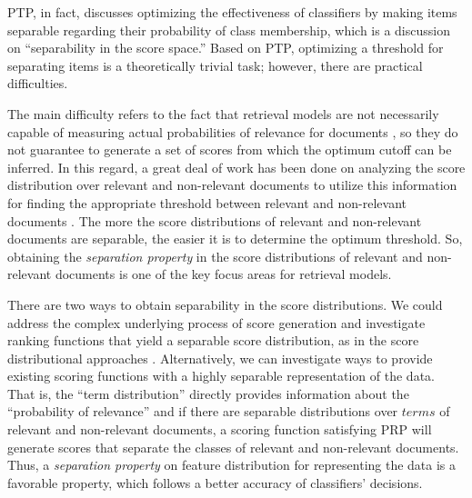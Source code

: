 PTP, in fact, discusses optimizing the effectiveness of classifiers by making items separable regarding their probability of class membership, which is a discussion on ``separability in the score space.'' Based on PTP, optimizing a threshold for separating items is a theoretically trivial task; however, there are practical difficulties. 

The main difficulty refers to the fact that retrieval models are not necessarily capable of measuring actual probabilities of relevance for documents \citep{Arampatzis:2001}, so they do not guarantee to generate a set of scores from which the optimum cutoff can be inferred. 
In this regard, a great deal of work has been done on analyzing the score distribution over relevant and non-relevant documents to utilize this information for finding the appropriate threshold between relevant and non-relevant documents \citep{Kanoulas:2009,Arampatzis:2009,Arampatzis:2001}. 
%
The more the score distributions of relevant and non-relevant documents are separable, the easier it is to determine the optimum threshold. 
So, obtaining the \emph{separation property} in the score distributions of relevant and non-relevant documents is one of the key focus areas for retrieval models.

There are two ways to obtain separability in the score distributions.  We could address the complex underlying process of score generation and investigate ranking functions that yield a separable score distribution, as in the score distributional approaches \citep{Arampatzis:2001}.  Alternatively, we can investigate ways to provide existing scoring functions with a highly separable representation of the data. 
That is, the ``term distribution'' directly provides information about the ``probability of relevance'' \citep{Crestani:1998} and if there are separable distributions over $terms$ of relevant and non-relevant documents, a scoring function satisfying PRP will generate scores that separate the classes of relevant and non-relevant documents. 
Thus, a \emph{separation property} on feature distribution for representing the data is a favorable property, which follows a better accuracy of classifiers' decisions.

